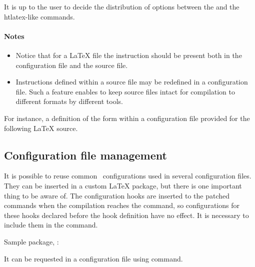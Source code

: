 It is up to the user to decide the distribution of options between the
\texcommand{\Preamble} and the htlatex-like commands.

\begin{texsource}
 
\EndPreamble 
\end{texsource}

\paragraph{Notes}

\begin{itemize}
  \item Notice that for a LaTeX file the \texcommand{}
    instruction should be present both in the configuration file and the source
    file.

  \item Instructions defined within a source file may be redefined in a
    configuration file. Such a feature enables to keep source files intact for
    compilation to different formats by different tools.
\end{itemize}

For instance, a definition of the form  within a
configuration file provided for the following LaTeX source.


\subsection{Configuration file management}

It is possible to reuse common \texfourht\ configurations used in several
configuration files.  They can be inserted in a custom LaTeX package, but there
is one important thing to be aware of. The configuration hooks are inserted to
the patched commands when the compilation reaches the  
\texcommand{} command, so configurations for these hooks
declared before the hook definition have no effect. It is necessary to include
them in the \texcommand{\AtBeginDocument} command.

Sample package, :


It can be requested in a configuration file using \texcommand{\RequirePackage} command.

\begin{texsource}
\RequirePackage{commonconfigurations}

\EndPreamble
\end{texsource}


